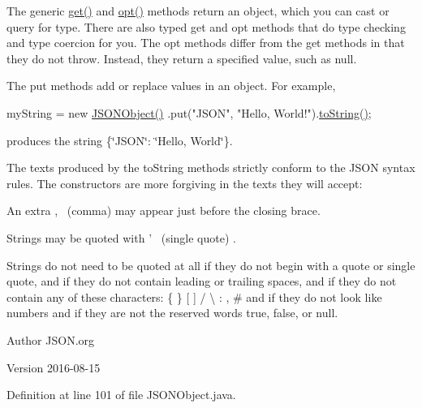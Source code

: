 The generic {\ttfamily \hyperlink{classorg_1_1json_1_1JSONObject_ac98329762a354373a0d3fddc2855dd61}{get()}} and {\ttfamily \hyperlink{classorg_1_1json_1_1JSONObject_a51eeabb3fde00474d3ffd7381ad5d311}{opt()}} methods return an object, which you can cast or query for type. There are also typed {\ttfamily get} and {\ttfamily opt} methods that do type checking and type coercion for you. The opt methods differ from the get methods in that they do not throw. Instead, they return a specified value, such as null. 

The {\ttfamily put} methods add or replace values in an object. For example,


\begin{DoxyPre}
myString = new \hyperlink{classorg_1_1json_1_1JSONObject_a7c17e59daff74ce50c6677c6f5da233d}{JSONObject()}
        .put("JSON", "Hello, World!").\hyperlink{classorg_1_1json_1_1JSONObject_a7f8cab6eb354ceb416a421574b4be424}{toString()};
\end{DoxyPre}


produces the string {\ttfamily \{\char`\"{}\-J\-S\-O\-N\char`\"{}\-: \char`\"{}\-Hello, World\char`\"{}\}}. 

The texts produced by the {\ttfamily to\-String} methods strictly conform to the J\-S\-O\-N syntax rules. The constructors are more forgiving in the texts they will accept\-: 
\begin{DoxyItemize}
\item An extra {\ttfamily ,}~
\footnotesize (comma)
\normalsize  may appear just before the closing brace. 
\item Strings may be quoted with {\ttfamily '}~
\footnotesize (single quote)
\normalsize . 
\item Strings do not need to be quoted at all if they do not begin with a quote or single quote, and if they do not contain leading or trailing spaces, and if they do not contain any of these characters\-: {\ttfamily \{ \} \mbox{[} \mbox{]} / \textbackslash{} \-: , \#} and if they do not look like numbers and if they are not the reserved words {\ttfamily true}, {\ttfamily false}, or {\ttfamily null}. 
\end{DoxyItemize}

\begin{DoxyAuthor}{Author}
J\-S\-O\-N.\-org 
\end{DoxyAuthor}
\begin{DoxyVersion}{Version}
2016-\/08-\/15 
\end{DoxyVersion}


Definition at line 101 of file J\-S\-O\-N\-Object.\-java.



